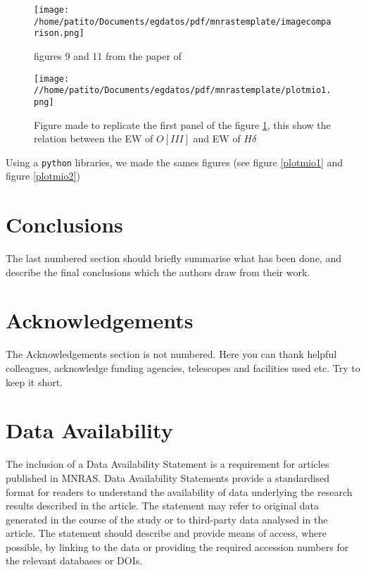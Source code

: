 \documentclass[fleqn,usenatbib]{mnras}
\begin{document}
\begin{figure}
	\texttt{[image: /home/patito/Documents/egdatos/pdf/mnrastemplate/imagecomparison.png]}
    \caption{figures 9 and 11 from the paper of \citet{Balogh}}
    \label{figsbaloghs}
\end{figure}

\begin{figure}
	\texttt{[image: //home/patito/Documents/egdatos/pdf/mnrastemplate/plotmio1.png]}
	\caption{Figure made to replicate the first panel of the figure \ref{figsbaloghs}, this show the relation between the EW of $O[III]$ and EW of $H\delta$}
\end{figure}




Using a \texttt{python} libraries, we made the sames figures (see figure \ref{plotmio1} and figure \ref{plotmio2})


\section{Conclusions}

The last numbered section should briefly summarise what has been done, and describe
the final conclusions which the authors draw from their work.

\section*{Acknowledgements}

The Acknowledgements section is not numbered. Here you can thank helpful
colleagues, acknowledge funding agencies, telescopes and facilities used etc.
Try to keep it short.

\section*{Data Availability}

 
The inclusion of a Data Availability Statement is a requirement for articles published in MNRAS. Data Availability Statements provide a standardised format for readers to understand the availability of data underlying the research results described in the article. The statement may refer to original data generated in the course of the study or to third-party data analysed in the article. The statement should describe and provide means of access, where possible, by linking to the data or providing the required accession numbers for the relevant databases or DOIs.
\end{document}
